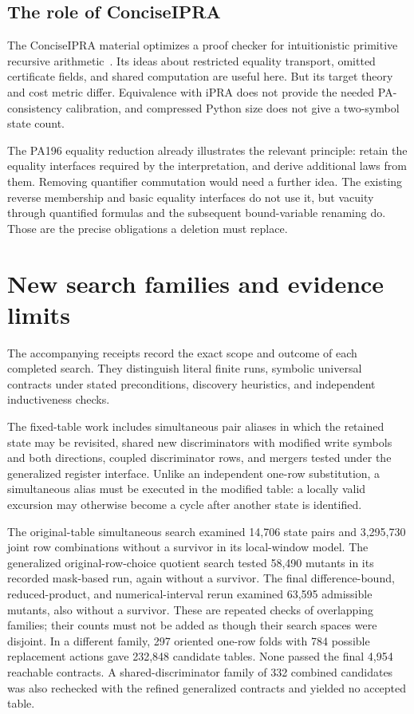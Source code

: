 \documentclass[11pt,letterpaper]{article}
\begin{document}
\subsection{The role of ConciseIPRA}

The ConciseIPRA material optimizes a proof checker for intuitionistic
primitive recursive arithmetic~\cite{ipra}. Its ideas about restricted
equality transport, omitted certificate fields, and shared computation
are useful here. But its target theory and cost metric differ. Equivalence
with iPRA does not provide the needed PA-consistency calibration, and
compressed Python size does not give a two-symbol state count.

The PA196 equality reduction already illustrates the relevant principle:
retain the equality interfaces required by the interpretation, and
derive additional laws from them. Removing quantifier commutation would
need a further idea. The existing reverse membership and basic equality
interfaces do not use it, but vacuity through quantified formulas and
the subsequent bound-variable renaming do. Those are the precise
obligations a deletion must replace.

\section{New search families and evidence limits}
\label{sec:searches}

The accompanying receipts record the exact scope and outcome of each
completed search. They distinguish literal finite runs, symbolic
universal contracts under stated preconditions, discovery heuristics,
and independent inductiveness checks.

The fixed-table work includes simultaneous pair aliases in which the
retained state may be revisited, shared new discriminators with modified
write symbols and both directions, coupled discriminator rows, and
mergers tested under the generalized register interface. Unlike an
independent one-row substitution, a simultaneous alias must be executed
in the modified table: a locally valid excursion may otherwise become
a cycle after another state is identified.

The original-table simultaneous search examined 14,706 state pairs and
3,295,730 joint row combinations without a survivor in its local-window
model. The generalized original-row-choice quotient search tested
58,490 mutants in its recorded mask-based run, again without a survivor.
The final difference-bound, reduced-product, and numerical-interval
rerun examined 63,595 admissible mutants, also without a survivor.
These are repeated checks of overlapping families; their counts must
not be added as though their search spaces were disjoint.
In a different family, 297 oriented one-row folds with 784 possible
replacement actions gave 232,848 candidate tables. None passed the
final 4,954 reachable contracts. A shared-discriminator family of 332 combined candidates
was also rechecked with the refined generalized contracts and yielded
no accepted table.
\end{document}
